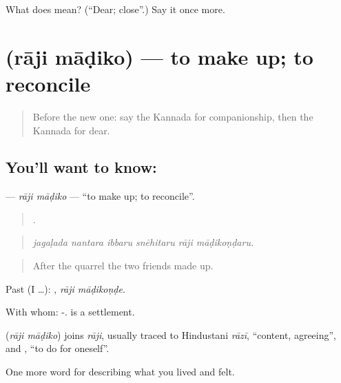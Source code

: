 \begin{tcolorbox}[breakable,colback=teal!4,colframe=teal!35!black,title={Before you move on}]
What does  mean? (\textquotedblleft{}Dear; close\textquotedblright{}.) Say it once more.
\end{tcolorbox}
\section[\texorpdfstring{\kn{ರಾಜಿ} \kn{ಮಾಡಿಕೊ} (rāji māḍiko)}{ರಾಜಿ ಮಾಡಿಕೊ (rāji māḍiko)}]{  (rāji māḍiko) — to make up; to reconcile}

\label{lesson:KA-C528-raji-madiko}



\begin{quote}
Before the new one: say the Kannada for companionship, then the Kannada for dear.
\end{quote}

\subsection*{You'll want to know:  }
\textbf{ } — \emph{rāji māḍiko} — \textquotedblleft{}to make up; to reconcile\textquotedblright{}.

\begin{quote}
     .
\end{quote}

\begin{quote}
\emph{jagaḷada nantara ibbaru snēhitaru rāji māḍikoṇḍaru.}
\end{quote}

\begin{quote}
After the quarrel the two friends made up.
\end{quote}

Past (I …):  , \emph{rāji māḍikoṇḍe}.

With whom: -.  is a settlement.

\begin{cousinweb}
\textbf{ } (\emph{rāji māḍiko}) joins \emph{rāji}, usually traced to Hindustani \emph{rāzī}, \textquotedblleft{}content, agreeing\textquotedblright{}, and , \textquotedblleft{}to do for oneself\textquotedblright{}.
\end{cousinweb}

\begin{grammarlens}[title={What you've built}]
One more word for describing what you lived and felt.
\end{grammarlens}

